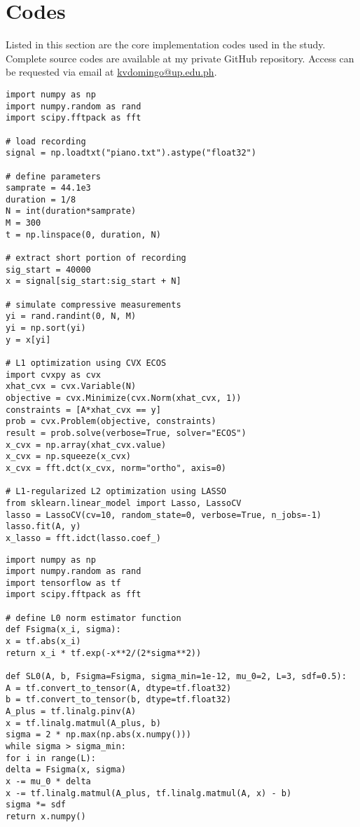 \chapter{Codes}
\label{appendix:codes}

Listed in this section are the core implementation codes used in the study. Complete source codes are available at my private GitHub repository. Access can be requested via email at \url{kvdomingo@up.edu.ph}.



\begin{lstlisting}
import numpy as np
import numpy.random as rand
import scipy.fftpack as fft

# load recording
signal = np.loadtxt("piano.txt").astype("float32")

# define parameters
samprate = 44.1e3
duration = 1/8
N = int(duration*samprate)
M = 300
t = np.linspace(0, duration, N)

# extract short portion of recording
sig_start = 40000
x = signal[sig_start:sig_start + N]

# simulate compressive measurements
yi = rand.randint(0, N, M)
yi = np.sort(yi)
y = x[yi]

# L1 optimization using CVX ECOS
import cvxpy as cvx
xhat_cvx = cvx.Variable(N)
objective = cvx.Minimize(cvx.Norm(xhat_cvx, 1))
constraints = [A*xhat_cvx == y]
prob = cvx.Problem(objective, constraints)
result = prob.solve(verbose=True, solver="ECOS")
x_cvx = np.array(xhat_cvx.value)
x_cvx = np.squeeze(x_cvx)
x_cvx = fft.dct(x_cvx, norm="ortho", axis=0)

# L1-regularized L2 optimization using LASSO
from sklearn.linear_model import Lasso, LassoCV
lasso = LassoCV(cv=10, random_state=0, verbose=True, n_jobs=-1)
lasso.fit(A, y)
x_lasso = fft.idct(lasso.coef_)
\end{lstlisting}


\begin{lstlisting}
import numpy as np
import numpy.random as rand
import tensorflow as tf
import scipy.fftpack as fft

# define L0 norm estimator function
def Fsigma(x_i, sigma):
x = tf.abs(x_i)
return x_i * tf.exp(-x**2/(2*sigma**2))

def SL0(A, b, Fsigma=Fsigma, sigma_min=1e-12, mu_0=2, L=3, sdf=0.5):
A = tf.convert_to_tensor(A, dtype=tf.float32)
b = tf.convert_to_tensor(b, dtype=tf.float32)
A_plus = tf.linalg.pinv(A)
x = tf.linalg.matmul(A_plus, b)
sigma = 2 * np.max(np.abs(x.numpy()))
while sigma > sigma_min:
for i in range(L):
delta = Fsigma(x, sigma)
x -= mu_0 * delta
x -= tf.linalg.matmul(A_plus, tf.linalg.matmul(A, x) - b)
sigma *= sdf
return x.numpy()
\end{lstlisting}

